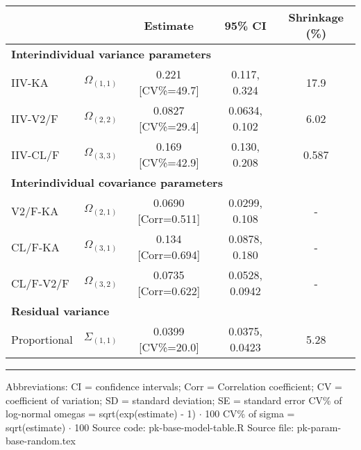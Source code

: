 \setlength{\tabcolsep}{5pt} 
\begin{threeparttable}
\renewcommand{\arraystretch}{1.3}
\begin{tabular}[h]{lcccc}
\hline
 &  & Estimate & 95\% CI & Shrinkage (\%) \\
\hline
\multicolumn{5}{l}{\textbf{Interindividual variance parameters}}\\%
IIV-KA & $\Omega_{(1,1)}$ & 0.221 [CV\%=49.7] & 0.117, 0.324 & 17.9 \\
IIV-V2/F & $\Omega_{(2,2)}$ & 0.0827 [CV\%=29.4] & 0.0634, 0.102 & 6.02 \\
IIV-CL/F & $\Omega_{(3,3)}$ & 0.169 [CV\%=42.9] & 0.130, 0.208 & 0.587 \\
\hline \multicolumn{5}{l}{\textbf{Interindividual covariance parameters}}\\%
V2/F-KA & $\Omega_{(2,1)}$ & 0.0690 [Corr=0.511] & 0.0299, 0.108 & - \\
CL/F-KA & $\Omega_{(3,1)}$ & 0.134 [Corr=0.694] & 0.0878, 0.180 & - \\
CL/F-V2/F & $\Omega_{(3,2)}$ & 0.0735 [Corr=0.622] & 0.0528, 0.0942 & - \\
\hline \multicolumn{5}{l}{\textbf{Residual variance}}\\%
Proportional & $\Sigma_{(1,1)}$ & 0.0399 [CV\%=20.0] & 0.0375, 0.0423 & 5.28 \\
\hline
\end{tabular}
\end{threeparttable}
 
\vspace{0.67cm}
 
\begin{minipage}{1\linewidth}
\linespread{1.1}\selectfont
\rule{1\linewidth}{0.4pt}
\vspace{0.02cm}
Abbreviations: CI = confidence intervals; 
                        Corr = Correlation coefficient;
                        CV = coefficient of variation;
                        SD = standard deviation;
                        SE = standard error \newline
CV\% of log-normal omegas = sqrt(exp(estimate) - 1) $\cdot$ 100 \newline
CV\% of sigma = sqrt(estimate) $\cdot$ 100 \newline
Source code: pk-base-model-table.R \newline
Source file: pk-param-base-random.tex \newline
\end{minipage}

